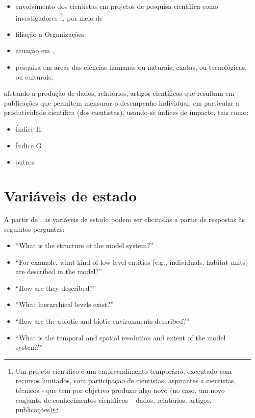 \begin{itemize}
    \item 
envolvimento dos cientistas em projetos de pesquisa científica como investigadores \footnote{
Um projeto científico é um empreendimento temporário, executado com recursos limitados, com participação de cientistas, aspirantes a cientistas, técnicos - que tem por objetivo produzir algo novo (no caso, um novo conjunto de conhecimentos científicos – dados, relatórios, artigos, publicações)}, por meio de 
\item filiação a Organizações;
\item atuação em  , 
\item pesquisa em áreas das ciências humanas ou naturais, exatas, ou tecnológicas, ou culturais;
\end{itemize}

afetando a produção de dados, relatórios, artigos científicos que resultam em publicações que permitem mensurar o desempenho individual, em particular a produtividade científica (dos cientistas), usando-se índices de impacto, tais como:
\begin{itemize}
\item Índice H
\item Índice G
\item outros 
\end{itemize}


\section{Variáveis de estado}

A partir de \citet{grimm_standard_2006}, as variáveis de estado podem ser elicitadas a partir de respostas às seguintes perguntas:
\begin{itemize}
\item ``What is the structure of the model system?'' 
\item ``For example, what kind of low-level entities (e.g., individuals, habitat units) are described in the model?'' 
\item ``How are they described?'' 
\item ``What hierarchical levels exist?'' 
\item ``How are the abiotic and biotic environments described?'' 
\item  ``What is the temporal and spatial resolution and extent of the model system?''
\end{itemize}

